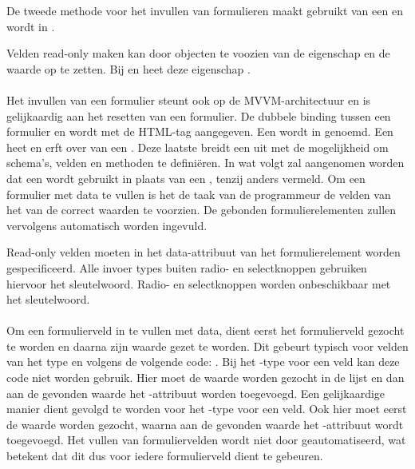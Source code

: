 De tweede methode voor het invullen van formulieren maakt gebruikt van een  en wordt in .

Velden read-only maken kan door objecten te voozien van de  eigenschap en de waarde op  te zetten.
Bij  en  heet deze eigenschap .


\paragraph{\kendo}
Het invullen van een formulier steunt ook op de MVVM-architectuur en is gelijkaardig aan het resetten van een formulier.
De dubbele binding tussen een formulier en  wordt met de HTML-tag  aangegeven.
Een  wordt in \kendo{}  genoemd.
Een  heet  en erft over van een .
Deze laatste breidt een  uit met de mogelijkheid om schema's,  velden en methoden te definiëren.  
In wat volgt zal aangenomen worden dat een  wordt gebruikt in plaats van een ,  tenzij anders vermeld.
Om een formulier met data te vullen is het de taak van de programmeur de velden van het  van de correct waarden te voorzien.
De gebonden formulierelementen zullen vervolgens automatisch worden ingevuld.


Read-only velden moeten in het data-attribuut van het formulierelement worden gespecificeerd.
Alle invoer types buiten radio- en selectknoppen gebruiken hiervoor het  sleutelwoord.
Radio- en selectknoppen worden onbeschikbaar met het  sleutelwoord.

\paragraph{\jqm}
Om een formulierveld in te vullen met data, dient eerst het formulierveld gezocht te worden en daarna zijn waarde gezet te worden.
Dit gebeurt typisch voor velden van het type  en  volgens de volgende code: .
Bij het -type voor een veld kan deze code niet worden gebruik.
Hier moet de waarde worden gezocht in de lijst en dan aan de gevonden waarde het -attribuut worden toegevoegd.
Een gelijkaardige manier dient gevolgd te worden voor het -type voor een veld.
Ook hier moet eerst de waarde worden gezocht, waarna aan de gevonden waarde het -attribuut wordt toegevoegd.
Het vullen van formuliervelden wordt niet door \jqm{} geautomatiseerd, wat betekent dat dit dus voor iedere formulierveld dient te gebeuren.


